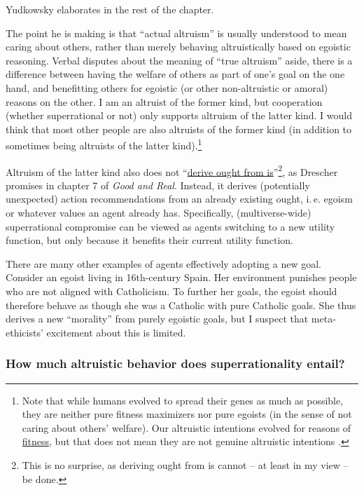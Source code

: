 Yudkowsky elaborates in the rest of the chapter.

The point he is making is that ``actual altruism'' is usually understood
to mean caring about others, rather than merely behaving altruistically
based on egoistic reasoning. Verbal disputes about the meaning of ``true
altruism'' aside, there is a difference between having the welfare of
others as part of one's goal on the one hand, and benefitting others for
egoistic (or other non-altruistic or amoral) reasons on the other. I am
an altruist of the former kind, but cooperation (whether superrational
or not) only supports altruism of the latter kind. I would think that
most other people are also altruists of the former kind (in addition to
sometimes being altruists of the latter kind).\footnote{Note that while
  humans evolved to spread their genes as much as possible, they are
  neither pure fitness maximizers nor pure egoists (in the sense of not
  caring about others' welfare). Our altruistic intentions evolved for
  reasons of
  \href{https://en.wikipedia.org/wiki/Fitness_\%28biology\%29}{fitness},
  but that does not mean they are not genuine altruistic intentions
  \parencites[][section 138]{Yudkowsky2015-tz}[][page 54f.]{Cosmides1995-bz}[][page 225f.]{Wright1995-po}.}

Altruism of the latter kind also does not
``\href{https://en.wikipedia.org/wiki/Is\%E2\%80\%93ought_problem}{derive
ought from is}''\footnote{This is no surprise, as
  deriving ought from is cannot -- at least in my view -- be done.}, as
Drescher promises in chapter 7 of \emph{Good and Real}. Instead, it
derives (potentially unexpected) action recommendations from an already
existing ought, i.\,e. egoism or whatever values an agent already has.
Specifically, (multiverse-wide) superrational compromise can be viewed
as agents switching to a new utility function, but only because it
benefits their current utility function.

There are many other examples of agents effectively adopting a new goal.
Consider an egoist living in 16th-century Spain. Her environment
punishes people who are not aligned with Catholicism. To further her
goals, the egoist should therefore behave as though she was a Catholic
with pure Catholic goals. She thus derives a new ``morality'' from
purely egoistic goals, but I suspect that meta-ethicists' excitement about this
is limited.

\subsubsection{How much altruistic behavior does superrationality
entail?}\label{how-much-altruistic-behavior-does-superrationality-entail}

